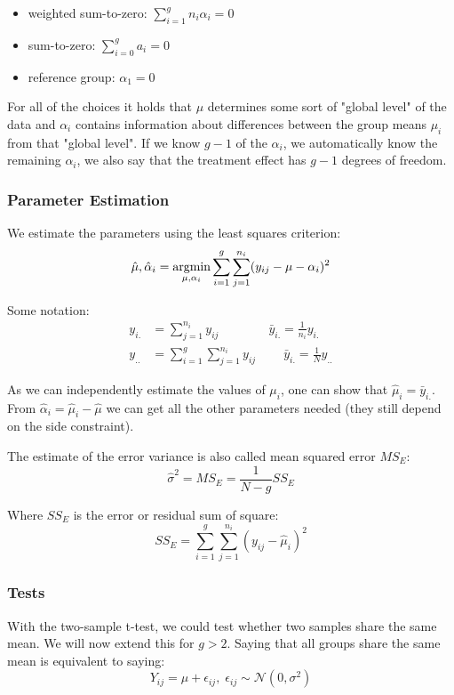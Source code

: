 \begin{itemize}
	\item weighted sum-to-zero: $\sum_{i=1}^{g} n_i \alpha_i = 0$
	\item sum-to-zero: $\sum_{i=0}^g a_i = 0$
	\item reference group: $\alpha_1 = 0$
\end{itemize}

For all of the choices it holds that $\mu$ determines some sort of "global level" of the data and $\alpha_i$ contains information about differences between the group means $\mu_i$ from that "global level". If we know $g-1$ of the $\alpha_i$, we automatically know the remaining $\alpha_i$, we also say that the treatment effect has $g-1$ degrees of freedom.

\subsubsection{Parameter Estimation}

We estimate the parameters using the least squares criterion:
$$\hat \mu, \hat \alpha_i = \underset{\mu, \alpha_i}{\text{argmin}} \sum_{i=1}^g \sum_{j=1}^{n_i}(y_{ij} - \mu - \alpha_i)^2$$

Some notation:
\begin{align*}
	y_{i.} &= \sum_{j=1}^{n_i}y_{ij} 			  \qquad \qquad  \bar y_{i.} = \frac{1}{n_i}y_{i.}\\
	y_{..} &= \sum_{i=1}^g \sum_{j=1}^{n_i}y_{ij} \qquad \ \bar y_{i.} = \frac{1}{N} y_{..}
\end{align*}

As we can independently estimate the values of $\mu_i$, one can show that $\hat \mu_i = \bar y_{i.}$. From $\hat \alpha_i = \hat \mu_i - \hat \mu$ we can get all the other parameters needed (they still depend on the side constraint).

The estimate of the error variance is also called mean squared error $MS_E$:
$$\hat \sigma^2 = MS_E = \frac{1}{N - g} SS_E$$

Where $SS_E$ is the error or residual sum of square:
$$SS_E = \sum_{i=1}^g \sum_{j=1}^{n_i}(y_{ij} - \hat \mu_i)^2$$

\subsubsection{Tests}

With the two-sample t-test, we could test whether two samples share the same mean. We will now extend this for $g > 2$. Saying that all groups share the same mean is equivalent to saying:
$$Y_{ij} = \mu + \epsilon_{ij}, \;\epsilon_{ij} \sim \mathcal N(0, \sigma^2)$$

